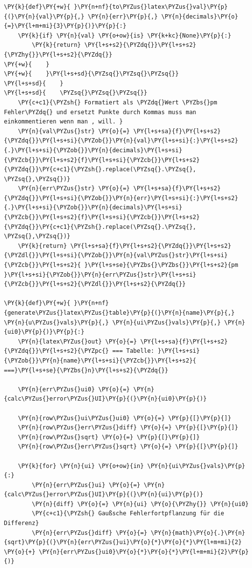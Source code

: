 \begin{tcolorbox}[breakable, size=fbox, boxrule=1pt, pad at break*=1mm,colback=cellbackground, colframe=cellborder]
\begin{Verbatim}[commandchars=\\\{\}]
\PY{k}{def}\PY{+w}{ }\PY{n+nf}{to\PYZus{}latex\PYZus{}val}\PY{p}{(}\PY{n}{val}\PY{p}{,} \PY{n}{err}\PY{p}{,} \PY{n}{decimals}\PY{o}{=}\PY{l+m+mi}{3}\PY{p}{)}\PY{p}{:}
    \PY{k}{if} \PY{n}{val} \PY{o+ow}{is} \PY{k+kc}{None}\PY{p}{:}
        \PY{k}{return} \PY{l+s+s2}{\PYZdq{}}\PY{l+s+s2}{\PYZhy{}}\PY{l+s+s2}{\PYZdq{}}
\PY{+w}{    }
\PY{+w}{    }\PY{l+s+sd}{\PYZsq{}\PYZsq{}\PYZsq{}}
\PY{l+s+sd}{    }
\PY{l+s+sd}{    \PYZsq{}\PYZsq{}\PYZsq{}}
    \PY{c+c1}{\PYZsh{} Formatiert als \PYZdq{}Wert \PYZbs{}pm Fehler\PYZdq{} und ersetzt Punkte durch Kommas muss man einkommentieren wenn man , will. }
    \PY{n}{val\PYZus{}str} \PY{o}{=} \PY{l+s+sa}{f}\PY{l+s+s2}{\PYZdq{}}\PY{l+s+si}{\PYZob{}}\PY{n}{val}\PY{l+s+si}{:}\PY{l+s+s2}{.}\PY{l+s+si}{\PYZob{}}\PY{n}{decimals}\PY{l+s+si}{\PYZcb{}}\PY{l+s+s2}{f}\PY{l+s+si}{\PYZcb{}}\PY{l+s+s2}{\PYZdq{}}\PY{c+c1}{\PYZsh{}.replace(\PYZsq{}.\PYZsq{}, \PYZsq{},\PYZsq{})}
    \PY{n}{err\PYZus{}str} \PY{o}{=} \PY{l+s+sa}{f}\PY{l+s+s2}{\PYZdq{}}\PY{l+s+si}{\PYZob{}}\PY{n}{err}\PY{l+s+si}{:}\PY{l+s+s2}{.}\PY{l+s+si}{\PYZob{}}\PY{n}{decimals}\PY{l+s+si}{\PYZcb{}}\PY{l+s+s2}{f}\PY{l+s+si}{\PYZcb{}}\PY{l+s+s2}{\PYZdq{}}\PY{c+c1}{\PYZsh{}.replace(\PYZsq{}.\PYZsq{}, \PYZsq{},\PYZsq{})}
    \PY{k}{return} \PY{l+s+sa}{f}\PY{l+s+s2}{\PYZdq{}}\PY{l+s+s2}{\PYZdl{}}\PY{l+s+si}{\PYZob{}}\PY{n}{val\PYZus{}str}\PY{l+s+si}{\PYZcb{}}\PY{l+s+s2}{ }\PY{l+s+se}{\PYZbs{}\PYZbs{}}\PY{l+s+s2}{pm }\PY{l+s+si}{\PYZob{}}\PY{n}{err\PYZus{}str}\PY{l+s+si}{\PYZcb{}}\PY{l+s+s2}{\PYZdl{}}\PY{l+s+s2}{\PYZdq{}}

\PY{k}{def}\PY{+w}{ }\PY{n+nf}{generate\PYZus{}latex\PYZus{}table}\PY{p}{(}\PY{n}{name}\PY{p}{,} \PY{n}{u\PYZus{}vals}\PY{p}{,} \PY{n}{ui\PYZus{}vals}\PY{p}{,} \PY{n}{ui0}\PY{p}{)}\PY{p}{:}
    \PY{n}{latex\PYZus{}out} \PY{o}{=} \PY{l+s+sa}{f}\PY{l+s+s2}{\PYZdq{}}\PY{l+s+s2}{\PYZpc{} === Tabelle: }\PY{l+s+si}{\PYZob{}}\PY{n}{name}\PY{l+s+si}{\PYZcb{}}\PY{l+s+s2}{ ===}\PY{l+s+se}{\PYZbs{}n}\PY{l+s+s2}{\PYZdq{}}
    
    \PY{n}{err\PYZus{}ui0} \PY{o}{=} \PY{n}{calc\PYZus{}error\PYZus{}UI}\PY{p}{(}\PY{n}{ui0}\PY{p}{)}
    
    \PY{n}{row\PYZus{}ui\PYZus{}ui0} \PY{o}{=} \PY{p}{[}\PY{p}{]}
    \PY{n}{row\PYZus{}err\PYZus{}diff} \PY{o}{=} \PY{p}{[}\PY{p}{]}
    \PY{n}{row\PYZus{}sqrt} \PY{o}{=} \PY{p}{[}\PY{p}{]}
    \PY{n}{row\PYZus{}err\PYZus{}sqrt} \PY{o}{=} \PY{p}{[}\PY{p}{]}
    
    \PY{k}{for} \PY{n}{ui} \PY{o+ow}{in} \PY{n}{ui\PYZus{}vals}\PY{p}{:}
        \PY{n}{err\PYZus{}ui} \PY{o}{=} \PY{n}{calc\PYZus{}error\PYZus{}UI}\PY{p}{(}\PY{n}{ui}\PY{p}{)}
        \PY{n}{diff} \PY{o}{=} \PY{n}{ui} \PY{o}{\PYZhy{}} \PY{n}{ui0}
        \PY{c+c1}{\PYZsh{} Gaußsche Fehlerfortpflanzung für die Differenz}
        \PY{n}{err\PYZus{}diff} \PY{o}{=} \PY{n}{math}\PY{o}{.}\PY{n}{sqrt}\PY{p}{(}\PY{n}{err\PYZus{}ui}\PY{o}{*}\PY{o}{*}\PY{l+m+mi}{2} \PY{o}{+} \PY{n}{err\PYZus{}ui0}\PY{o}{*}\PY{o}{*}\PY{l+m+mi}{2}\PY{p}{)}
        

\end{Verbatim}
\end{tcolorbox}
